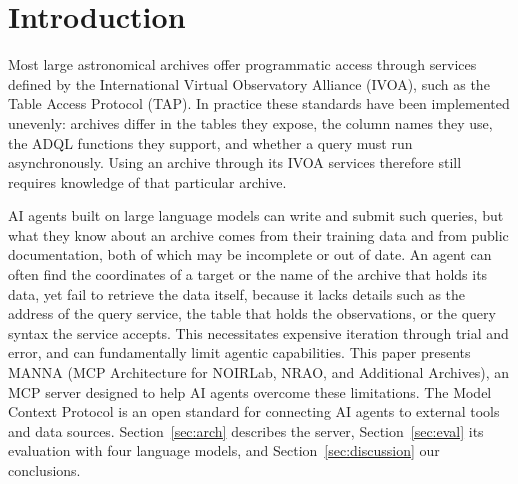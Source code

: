 \documentclass[11pt,twoside]{article}
\begin{document}
\begin{abstract}
While many astronomical data archives implement the same set of standards defined by the International Virtual Observatory Alliance (IVOA), differences in underlying data and architectural implementations necessitate significant archive-specific knowledge. We present MANNA (MCP Architecture for NOIRLab, NRAO, and Additional Archives), a Model Context Protocol (MCP) server that provides AI agents with tools for archive discovery and data querying. With a custom evaluation framework, we ran archive tasks with and without MANNA for one open-weight and three Anthropic Claude models. MANNA reduced the time needed per solved task for all four models and substantially increased the number of tasks passed by the smallest Claude model. The differences were larger when the time and turns per task were limited. MANNA is compatible with all IVOA-based astronomical archives.
\end{abstract}

\section{Introduction}
\label{sec:intro}
Most large astronomical archives offer programmatic access through services defined by the International Virtual Observatory Alliance (IVOA), such as the Table Access Protocol (TAP). In practice these standards have been implemented unevenly: archives differ in the tables they expose, the column names they use, the ADQL functions they support, and whether a query must run asynchronously. Using an archive through its IVOA services therefore still requires knowledge of that particular archive.

AI agents built on large language models can write and submit such queries, but what they know about an archive comes from their training data and from public documentation, both of which may be incomplete or out of date. An agent can often find the coordinates of a target or the name of the archive that holds its data, yet fail to retrieve the data itself, because it lacks details such as the address of the query service, the table that holds the observations, or the query syntax the service accepts. This necessitates expensive iteration through trial and error, and can fundamentally limit agentic capabilities. This paper presents MANNA (MCP Architecture for NOIRLab, NRAO, and Additional Archives), an MCP server designed to help AI agents overcome these limitations. The Model Context Protocol \citep[MCP;][]{Anthropic2024mcp} is an open standard for connecting AI agents to external tools and data sources. Section~\ref{sec:arch} describes the server, Section~\ref{sec:eval} its evaluation with four language models, and Section~\ref{sec:discussion} our conclusions.
\end{document}
